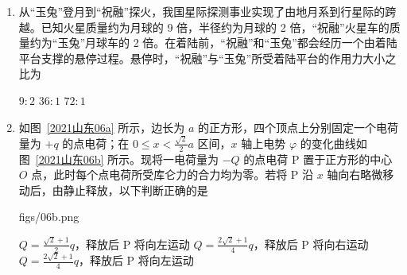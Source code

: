 \documentclass[\gkver]{gaokaozhenti}
\begin{document}
\begin{enumerate}
{	故选 D。
}

\item
从“玉兔”登月到“祝融”探火，我国星际探测事业实现了由地月系到行星际的跨越。已知火星质量约为月球的 9 倍，半径约为月球的 2 倍，“祝融”火星车的质量约为“玉兔”月球车的 2 倍。在着陆前，“祝融”和“玉兔”都会经历一个由着陆平台支撑的悬停过程。悬停时，“祝融”与“玉兔”所受着陆平台的作用力大小之比为 


{$9:2$}
{$36:1$}
{$72:1$}


\item
如图~\ref{2021山东06a} 所示，边长为 $a$ 的正方形，四个顶点上分别固定一个电荷量为 $+q$ 的点电荷；在 $0 \leqslant x < \frac{\sqrt{2}}{2}a$ 区间，$x$ 轴上电势 $\varphi$ 的变化曲线如图~\ref{2021山东06b} 所示。现将一电荷量为 $-Q$ 的点电荷 P 置于正方形的中心 $O$ 点，此时每个点电荷所受库仑力的合力均为零。若将 P 沿 $x$ 轴向右略微移动后，由静止释放，以下判断正确的是 

{figs/06b.png}

{$Q = \frac{\sqrt{2}+1}{2}q$，释放后 P 将向左运动}
{$Q = \frac{2\sqrt{2}+1}{4}q$，释放后 P 将向右运动}
{$Q = \frac{2\sqrt{2}+1}{4}q$，释放后 P 将向左运动}

\end{enumerate}
\end{document}
